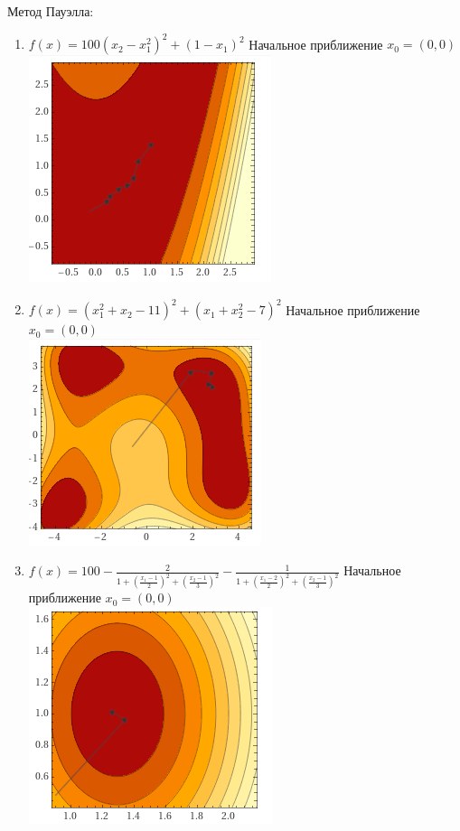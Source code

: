 \documentclass[a4paper, 14pt]{article}
\begin{document}
Метод Пауэлла:\\
\begin{enumerate}
\item $f(x) = 100(x_2 - x_1^2)^2 + (1 - x_1)^2 $
Начальное приближение $x_0 = (0, 0)$\\
\includegraphics{img/K9.png}\\

\item $f(x) = (x_1^2 + x_2 - 11)^2 + (x_1 + x_2^2 - 7) ^ 2 $
Начальное приближение $x_0 = (0, 0)$\\
\includegraphics{img/K7.png}\\

\item $f(x) = 100 -\frac{2}{1 + (\frac{x_1 - 1}{2})^2 + (\frac{x_2 - 1}{3})^2} -\frac{1}{1 + (\frac{x_1 - 2}{2})^2 + (\frac{x_2 - 1}{3})^2} $
Начальное приближение $x_0 = (0, 0)$\\
\includegraphics{img/K8.png}\\
\end{enumerate}
\end{document}
